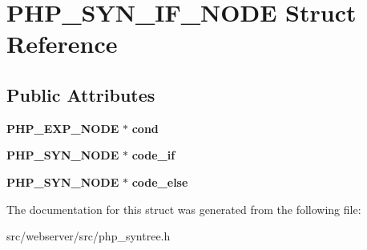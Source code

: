 \section{PHP\_\-SYN\_\-IF\_\-NODE Struct Reference}
\label{structPHP__SYN__IF__NODE}
\subsection*{Public Attributes}
\begin{DoxyCompactItemize}
\item 
{\bf PHP\_\-EXP\_\-NODE} $\ast$ {\bfseries cond}\label{structPHP__SYN__IF__NODE_ad0f5df5b7bf2d5d1d990ca3e0ff45d20}

\item 
{\bf PHP\_\-SYN\_\-NODE} $\ast$ {\bfseries code\_\-if}\label{structPHP__SYN__IF__NODE_a7134776e6118b0720b727535485a8221}

\item 
{\bf PHP\_\-SYN\_\-NODE} $\ast$ {\bfseries code\_\-else}\label{structPHP__SYN__IF__NODE_ad4c8baada4d3614b475543e614c6f491}

\end{DoxyCompactItemize}


The documentation for this struct was generated from the following file:\begin{DoxyCompactItemize}
\item 
src/webserver/src/php\_\-syntree.h\end{DoxyCompactItemize}
